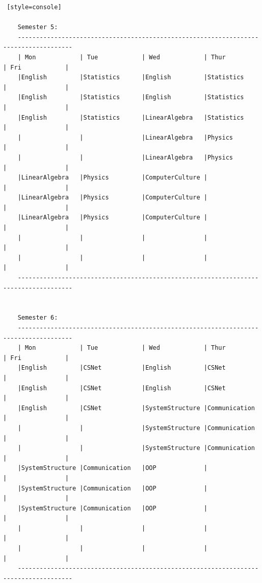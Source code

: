 \begin{lstlisting} [style=console]
    
    Semester 5: 
    -------------------------------------------------------------------------------------
    | Mon            | Tue            | Wed            | Thur           | Fri            |
    |English         |Statistics      |English         |Statistics      |                |
    |English         |Statistics      |English         |Statistics      |                |
    |English         |Statistics      |LinearAlgebra   |Statistics      |                |
    |                |                |LinearAlgebra   |Physics         |                |
    |                |                |LinearAlgebra   |Physics         |                |
    |LinearAlgebra   |Physics         |ComputerCulture |                |                |
    |LinearAlgebra   |Physics         |ComputerCulture |                |                |
    |LinearAlgebra   |Physics         |ComputerCulture |                |                |
    |                |                |                |                |                |
    |                |                |                |                |                |
    -------------------------------------------------------------------------------------
    
    
    Semester 6: 
    -------------------------------------------------------------------------------------
    | Mon            | Tue            | Wed            | Thur           | Fri            |
    |English         |CSNet           |English         |CSNet           |                |
    |English         |CSNet           |English         |CSNet           |                |
    |English         |CSNet           |SystemStructure |Communication   |                |
    |                |                |SystemStructure |Communication   |                |
    |                |                |SystemStructure |Communication   |                |
    |SystemStructure |Communication   |OOP             |                |                |
    |SystemStructure |Communication   |OOP             |                |                |
    |SystemStructure |Communication   |OOP             |                |                |
    |                |                |                |                |                |
    |                |                |                |                |                |
    -------------------------------------------------------------------------------------
    

\end{lstlisting}
